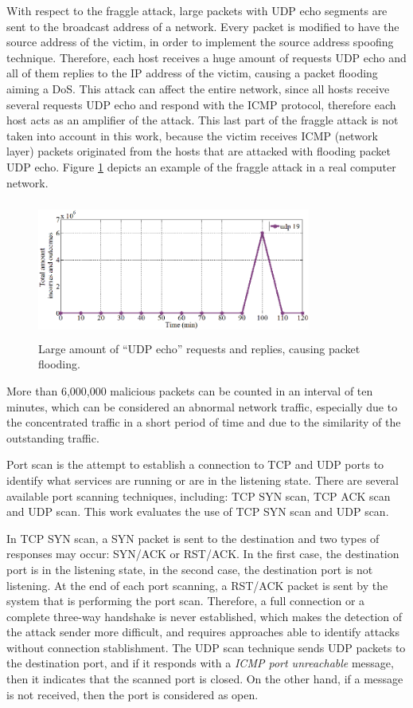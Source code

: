 \documentclass[review]{elsarticle}
\providecommand{\DIFaddtex}[1]{{\protect\color{blue}\uwave{#1}}} %
\providecommand{\DIFaddbegin}{} %
\providecommand{\DIFaddend}{} %
\providecommand{\DIFadd}[1]{\texorpdfstring{\DIFaddtex{#1}}{#1}} %
\begin{document}
With respect to the fraggle attack, large packets with UDP echo segments are sent to the broadcast address of a network. Every packet is modified to have the source address of the victim, in order to implement the source address spoofing technique. Therefore, each host receives a huge amount of requests UDP echo and all of them replies to the IP address of the victim, causing a packet flooding aiming a DoS. This attack can affect the entire network, since all hosts receive several requests UDP echo and respond with the ICMP protocol, therefore each host acts as an amplifier of the attack. This last part of the fraggle attack is not taken into account in this work, because the victim receives ICMP (network layer) packets originated from the hosts that are attacked with flooding packet UDP echo. Figure \ref{fig:fig6} depicts an example of the fraggle attack in a real computer network. 

\begin{figure}[h!]
     \centering 
     \includegraphics[height=4.5cm, width=9cm]{results/figures/fig06.png}
     \caption{Large amount of “UDP echo” requests and replies, causing packet flooding.}
     \label{fig:fig6}
\end{figure}

More than 6,000,000 malicious packets can be counted in an interval of ten minutes, which can be considered an abnormal network traffic, especially due to the concentrated traffic in a short period of time and due to the similarity of the outstanding traffic.

Port scan is the attempt to establish a connection to TCP and UDP ports to identify what services are running or are in the listening state. There are several available port scanning techniques, including: TCP SYN scan, TCP ACK scan and UDP scan. This work evaluates the use of TCP SYN scan and UDP scan. 

In TCP SYN scan, a SYN packet is sent to the destination and two types of responses may occur: SYN/ACK or RST/ACK. In the first case, the destination port is in the listening state, in the second case, the destination port is not listening. At the end of each port scanning, a RST/ACK packet is sent by the system that is performing the port scan. Therefore, a full connection or a complete three-way handshake is never established, which makes the detection of the attack sender more difficult, and requires approaches able to identify \DIFaddbegin \DIFadd{probe }\DIFaddend attacks without connection stablishment. The UDP scan technique sends UDP packets to the destination port, and if it responds with a \emph{ICMP port unreachable} message, then it indicates that the scanned port is closed. On the other hand, if a message is not received, then the port is considered as open.
\end{document}
